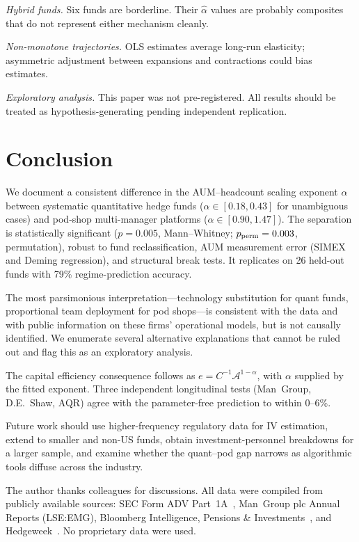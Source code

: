 \documentclass[12pt]{article}
\newcommand{\Ac}{\mathcal{A}}
\newcommand{\alphahat}{\hat{\alpha}}
\begin{document}
\textit{Hybrid funds.}
Six funds are borderline.
Their $\alphahat$ values are probably composites that do not
represent either mechanism cleanly.

\textit{Non-monotone trajectories.}
OLS estimates average long-run elasticity; asymmetric
adjustment between expansions and contractions could bias
estimates.

\textit{Exploratory analysis.}
This paper was not pre-registered.
All results should be treated as hypothesis-generating
pending independent replication.


\section{Conclusion}
\label{sec:conclusion}

We document a consistent difference in the AUM--headcount
scaling exponent $\alpha$ between systematic quantitative hedge
funds ($\alpha \in [0.18, 0.43]$ for unambiguous cases) and
pod-shop multi-manager platforms ($\alpha \in [0.90, 1.47]$).
The separation is statistically significant ($p = 0.005$,
Mann--Whitney; $p_{\rm perm} = 0.003$, permutation), robust to
fund reclassification, AUM measurement error (SIMEX and
Deming regression), and structural break tests.
It replicates on 26 held-out funds with 79\% regime-prediction
accuracy.

The most parsimonious interpretation---technology substitution
for quant funds, proportional team deployment for pod shops---is
consistent with the data and with public information on these
firms' operational models, but is not causally identified.
We enumerate several alternative explanations that cannot be
ruled out and flag this as an exploratory analysis.

The capital efficiency consequence follows as
$e = C^{-1}\Ac^{1-\alpha}$, with $\alpha$ supplied by the
fitted exponent.
Three independent longitudinal tests (Man~Group, D.E.~Shaw,
AQR) agree with the parameter-free prediction to within
0--6\%.

Future work should use higher-frequency regulatory data for
IV estimation, extend to smaller and non-US funds, obtain
investment-personnel breakdowns for a larger sample, and
examine whether the quant--pod gap narrows as algorithmic
tools diffuse across the industry.

\bigskip
\noindent
The author thanks colleagues for discussions.
All data were compiled from publicly available sources:
SEC Form ADV Part~1A~\cite{sec_adv}, Man~Group plc Annual Reports
(LSE:EMG), Bloomberg Intelligence, Pensions \&
Investments~\cite{pandi2024}, and Hedgeweek~\cite{hedgeweek2024}.
No proprietary data were used.


\end{document}
